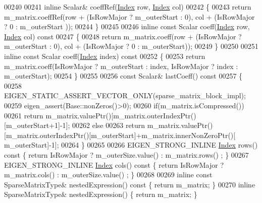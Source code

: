 \begin{DoxyCode}
00240 
00241     \textcolor{keyword}{inline} Scalar& coeffRef(\hyperlink{namespace_eigen_a62e77e0933482dafde8fe197d9a2cfde}{Index} row, \hyperlink{namespace_eigen_a62e77e0933482dafde8fe197d9a2cfde}{Index} col)
00242     \{
00243       \textcolor{keywordflow}{return} m\_matrix.coeffRef(row + (IsRowMajor ? m\_outerStart : 0), col + (IsRowMajor ? 0 :  m\_outerStart
      ));
00244     \}
00245 
00246     \textcolor{keyword}{inline} \textcolor{keyword}{const} Scalar coeff(\hyperlink{namespace_eigen_a62e77e0933482dafde8fe197d9a2cfde}{Index} row, \hyperlink{namespace_eigen_a62e77e0933482dafde8fe197d9a2cfde}{Index} col)\textcolor{keyword}{ const}
00247 \textcolor{keyword}{    }\{
00248       \textcolor{keywordflow}{return} m\_matrix.coeff(row + (IsRowMajor ? m\_outerStart : 0), col + (IsRowMajor ? 0 :  m\_outerStart));
00249     \}
00250 
00251     \textcolor{keyword}{inline} \textcolor{keyword}{const} Scalar coeff(\hyperlink{namespace_eigen_a62e77e0933482dafde8fe197d9a2cfde}{Index} index)\textcolor{keyword}{ const}
00252 \textcolor{keyword}{    }\{
00253       \textcolor{keywordflow}{return} m\_matrix.coeff(IsRowMajor ? m\_outerStart : index, IsRowMajor ? index :  m\_outerStart);
00254     \}
00255 
00256     \textcolor{keyword}{const} Scalar& lastCoeff()\textcolor{keyword}{ const}
00257 \textcolor{keyword}{    }\{
00258       EIGEN\_STATIC\_ASSERT\_VECTOR\_ONLY(sparse\_matrix\_block\_impl);
00259       eigen\_assert(Base::nonZeros()>0);
00260       \textcolor{keywordflow}{if}(m\_matrix.isCompressed())
00261         \textcolor{keywordflow}{return} m\_matrix.valuePtr()[m\_matrix.outerIndexPtr()[m\_outerStart+1]-1];
00262       \textcolor{keywordflow}{else}
00263         \textcolor{keywordflow}{return} m\_matrix.valuePtr()[m\_matrix.outerIndexPtr()[m\_outerStart]+m\_matrix.innerNonZeroPtr()[
      m\_outerStart]-1];
00264     \}
00265 
00266     EIGEN\_STRONG\_INLINE \hyperlink{namespace_eigen_a62e77e0933482dafde8fe197d9a2cfde}{Index} rows()\textcolor{keyword}{ const }\{ \textcolor{keywordflow}{return} IsRowMajor ? m\_outerSize.value() : m\_matrix.rows()
      ; \}
00267     EIGEN\_STRONG\_INLINE \hyperlink{namespace_eigen_a62e77e0933482dafde8fe197d9a2cfde}{Index} cols()\textcolor{keyword}{ const }\{ \textcolor{keywordflow}{return} IsRowMajor ? m\_matrix.cols() : m\_outerSize.value()
      ; \}
00268 
00269     \textcolor{keyword}{inline} \textcolor{keyword}{const} SparseMatrixType& nestedExpression()\textcolor{keyword}{ const }\{ \textcolor{keywordflow}{return} m\_matrix; \}
00270     \textcolor{keyword}{inline} SparseMatrixType& nestedExpression() \{ \textcolor{keywordflow}{return} m\_matrix; \}

\end{DoxyCode}
